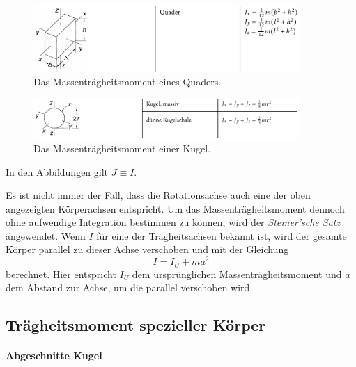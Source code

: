 \begin{figure}
    \centering
    \includegraphics[width=0.9\textwidth]{plots/TrägheitQuader.png}
    \caption{Das Massenträgheitsmoment eines Quaders.\cite{taschenbuch}}
    \label{fig:traegQuader}
\end{figure}

\begin{figure}
    \centering
    \includegraphics[width=0.9\textwidth]{plots/TrägheitKugel.png}
    \caption{Das Massenträgheitsmoment einer Kugel.\cite{taschenbuch}}
    \label{fig:traegKug}
\end{figure}

In den Abbildungen gilt $J \equiv I$.

Es ist nicht immer der Fall, dass die Rotationsachse auch eine der oben angezeigten Körperachsen entspricht.
Um das Massenträgheitsmoment dennoch ohne aufwendige Integration bestimmen zu können, wird der \textit{Steiner'sche
Satz} angewendet. Wenn $I$ für eine der Trägheitsachsen bekannt ist, wird der gesamte Körper parallel
zu dieser Achse verschoben und mit der Gleichung
\begin{equation}
    I = I_U + ma^2
\end{equation}
berechnet. Hier entspricht $I_U$ dem ursprünglichen Massenträgheitsmoment und $a$ dem Abstand zur Achse, um die 
parallel verschoben wird.

\subsection{Trägheitsmoment spezieller Körper}
\label{sub:Trägheitsmoment}

\paragraph{Abgeschnitte Kugel}

